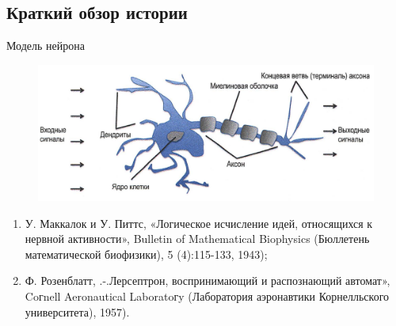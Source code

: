 \documentclass{beamer}
\begin{document}
\subsection{Краткий обзор истории}
\begin{frame}[t]{Модель нейрона}
\begin{figure}[h]
\centering
\includegraphics[scale=0.3]{images/lec03-pic01.png}
\end{figure}
\begin{enumerate}
\item У. Маккалок и У. Питтс, «Логическое исчисление идей, относящихся к нервной активности», Bulletin of Mathematical Biophysics (Бюллетень математической биофизики), 5 (4):115-133, 1943);
\item Ф. Розенблатт, .-.Лерсептрон, воспринимающий и распознающий автомат», Coгnell
Aeronautical Laboratoгy (Лаборатория аэронавтики Корнелльского университета),
1957).
\end{enumerate}
\end{frame}
\end{document}

